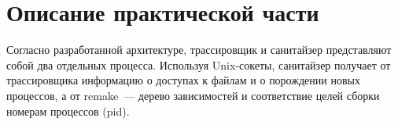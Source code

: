 \section{Описание практической части}
\label{sec:Chapter4} 


Согласно разработанной архитектуре, трассировщик и санитайзер представляют собой два отдельных процесса. Используя Unix-сокеты, санитайзер получает от трассировщика информацию о доступах к файлам и о порождении новых процессов, а от remake~--- дерево зависимостей и соответствие целей сборки номерам процессов (pid).


